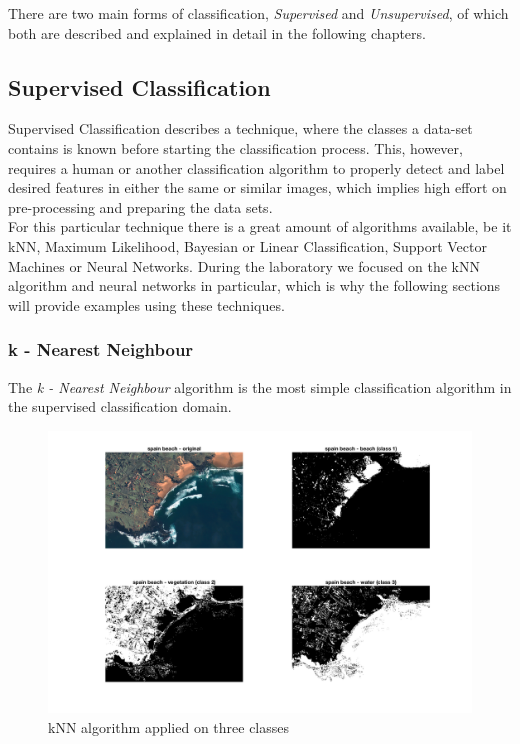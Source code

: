 There are two main forms of classification, \textit{Supervised} and \textit{Unsupervised}, of which both are described and explained in detail in the following chapters.


\subsection{Supervised Classification}
Supervised Classification describes a technique, where the classes a data-set contains is known before starting the classification process. This, however, requires a human or another classification algorithm to properly detect and label desired features in either the same or similar images, which implies high effort on pre-processing and preparing the data sets.\\
For this particular technique there is a great amount of algorithms available, be it kNN, Maximum Likelihood, Bayesian or Linear Classification, Support Vector Machines or Neural Networks. During the laboratory we focused on the kNN algorithm and neural networks in particular, which is why the following sections will provide examples using these techniques.

\subsubsection{k - Nearest Neighbour}
\label{sssec:knn}
The \textit{k - Nearest Neighbour} algorithm is the most simple classification algorithm in the supervised classification domain. 

\begin{figure}[h!]
	\centering
	\includegraphics[width=\textwidth]{images/kNN.png}
	\caption{kNN algorithm applied on three classes}
	\label{fig:kNN}
\end{figure}

